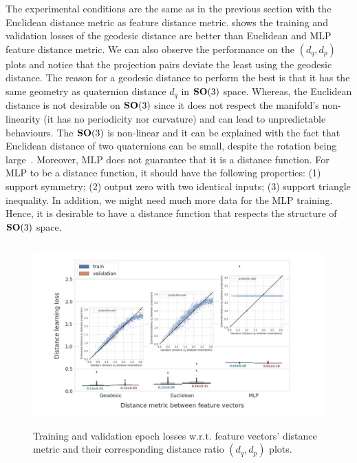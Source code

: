 The experimental conditions are the same as in the previous section with the Euclidean distance metric as feature distance metric.
 shows the training and validation losses of the geodesic distance are better than Euclidean and MLP feature distance metric. We can also observe the performance on the $(d_q, d_p)$ plots and notice that the projection pairs deviate the least using the geodesic distance.
The reason for a geodesic distance to perform the best is that it has the same geometry as quaternion distance $d_q$ in $\mathrm{\mathbf{SO}}(3)$ space. Whereas, the Euclidean distance is not desirable on $\mathrm{\mathbf{SO}}(3)$ since it does not respect the manifold's non-linearity (it has no periodicity nor curvature) and can lead to unpredictable behaviours. The $\mathrm{\mathbf{SO}}(3)$ is non-linear and it can be explained with the fact that Euclidean distance of two quaternions can be small, despite the rotation being large~\cite{huynh_metrics_2009,DBLP:journals/corr/abs-1805-01026}.
Moreover, MLP does not guarantee that it is a distance function. For MLP to be a distance function, it should have the following properties: (1) support symmetry; (2) output zero with two identical inputs; (3) support triangle inequality. In addition, we might need much more data for the MLP training.
Hence, it is desirable to have a distance function that respects the structure of $\mathrm{\mathbf{SO}}(3)$ space. 

\begin{figure}
    \centering
    \includegraphics[height=7cm]{figures/geo_eucl_mlp_distance_metric.pdf}
    \caption{
        Training and validation epoch losses w.r.t. feature vectors' distance metric and their corresponding distance ratio $(d_q, d_p)$ plots.
    }\label{fig:geo-eucl-mlp}
\end{figure}

